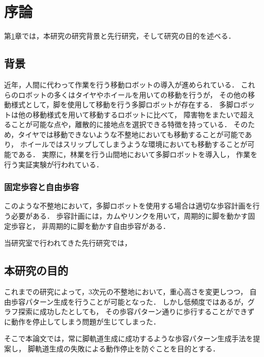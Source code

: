 ﻿%

\chapter{序論}\label{chapter:序論}
第\ref{chapter:序論}章では，本研究の研究背景と先行研究，そして研究の目的を述べる．


\section{背景}
近年，人間に代わって作業を行う移動ロボットの導入が進められている．
これらのロボットの多くはタイヤやホイールを用いての移動を行うが，
その他の移動様式として，脚を使用して移動を行う多脚ロボットが存在する．
多脚ロボットは他の移動様式を用いて移動するロボットに比べて，
障害物をまたいで超えることが可能な点や，離散的に接地点を選択できる特徴を持っている．
そのため，タイヤでは移動できないような不整地においても移動することが可能であり，
ホイールではスリップしてしまうような環境においても移動することが可能である．
実際に，林業を行う山間地において多脚ロボットを導入し，
作業を行う実証実験が行われている\cite{NEDO}．

\subsection{固定歩容と自由歩容}
このような不整地において，多脚ロボットを使用する場合は適切な歩容計画を行う必要がある．
歩容計画には，カムやリンクを用いて，周期的に脚を動かす固定歩容と，
非周期的に脚を動かす自由歩容がある．

当研究室で行われてきた先行研究では，

\section{本研究の目的}
これまでの研究によって，3次元の不整地において，重心高さを変更しつつ，
自由歩容パターン生成を行うことが可能となった．
しかし低頻度ではあるが，グラフ探索に成功したとしても，
その歩容パターン通りに歩行することができずに動作を停止してしまう問題が生じてしまった．

そこで本論文では，常に脚軌道生成に成功するような歩容パターン生成手法を提案し，
脚軌道生成の失敗による動作停止を防ぐことを目的とする．

